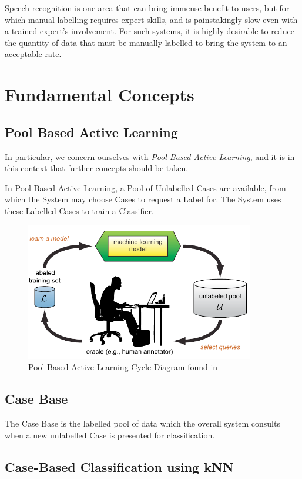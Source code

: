 \documentclass[a4paper,11pt]{report}
\begin{document}
Speech recognition is one area that can bring immense benefit to users, but for which manual labelling requires expert skills, and is painstakingly slow even with a trained expert's involvement. For such systems, it is highly desirable to reduce the quantity of data that must be manually labelled to bring the system to an acceptable rate.

\section{Fundamental Concepts}
\subsection{Pool Based Active Learning}
In particular, we concern ourselves with \emph{Pool Based Active Learning}, and it is in this context that further concepts should be taken.

In Pool Based Active Learning, a Pool of Unlabelled Cases are available, from which the System may choose Cases to request a Label for. The System uses these Labelled Cases to train a Classifier.

\begin{figure}[h!]
\includegraphics[width=10cm]{./Others/Settles2010PoolBasedImage}
\caption{Pool Based Active Learning Cycle Diagram found in \citep{Settles2010}}
\end{figure}

\subsection{Case Base}
The Case Base is the labelled pool of data which the overall system consults when a new unlabelled Case is presented for classification.

\subsection{Case-Based Classification using kNN}
\end{document}
